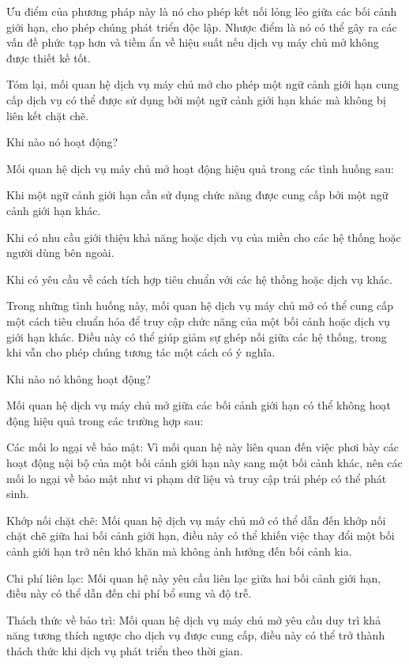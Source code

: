 Ưu điểm của phương pháp này là nó cho phép kết nối lỏng lẻo giữa các bối cảnh giới hạn, cho phép chúng phát triển độc lập. Nhược điểm là nó có thể gây ra các vấn đề phức tạp hơn và tiềm ẩn về hiệu suất nếu dịch vụ máy chủ mở không được thiết kế tốt.

Tóm lại, mối quan hệ dịch vụ máy chủ mở cho phép một ngữ cảnh giới hạn cung cấp dịch vụ có thể được sử dụng bởi một ngữ cảnh giới hạn khác mà không bị liên kết chặt chẽ.

Khi nào nó hoạt động?

Mối quan hệ dịch vụ máy chủ mở hoạt động hiệu quả trong các tình huống sau:

Khi một ngữ cảnh giới hạn cần sử dụng chức năng được cung cấp bởi một ngữ cảnh giới hạn khác.

Khi có nhu cầu giới thiệu khả năng hoặc dịch vụ của miền cho các hệ thống hoặc người dùng bên ngoài.

Khi có yêu cầu về cách tích hợp tiêu chuẩn với các hệ thống hoặc dịch vụ khác.

Trong những tình huống này, mối quan hệ dịch vụ máy chủ mở có thể cung cấp một cách tiêu chuẩn hóa để truy cập chức năng của một bối cảnh hoặc dịch vụ giới hạn khác. Điều này có thể giúp giảm sự ghép nối giữa các hệ thống, trong khi vẫn cho phép chúng tương tác một cách có ý nghĩa.

Khi nào nó không hoạt động?

Mối quan hệ dịch vụ máy chủ mở giữa các bối cảnh giới hạn có thể không hoạt động hiệu quả trong các trường hợp sau:

Các mối lo ngại về bảo mật: Vì mối quan hệ này liên quan đến việc phơi bày các hoạt động nội bộ của một bối cảnh giới hạn này sang một bối cảnh khác, nên các mối lo ngại về bảo mật như vi phạm dữ liệu và truy cập trái phép có thể phát sinh.

Khớp nối chặt chẽ: Mối quan hệ dịch vụ máy chủ mở có thể dẫn đến khớp nối chặt chẽ giữa hai bối cảnh giới hạn, điều này có thể khiến việc thay đổi một bối cảnh giới hạn trở nên khó khăn mà không ảnh hưởng đến bối cảnh kia.

Chi phí liên lạc: Mối quan hệ này yêu cầu liên lạc giữa hai bối cảnh giới hạn, điều này có thể dẫn đến chi phí bổ sung và độ trễ.

Thách thức về bảo trì: Mối quan hệ dịch vụ máy chủ mở yêu cầu duy trì khả năng tương thích ngược cho dịch vụ được cung cấp, điều này có thể trở thành thách thức khi dịch vụ phát triển theo thời gian.






